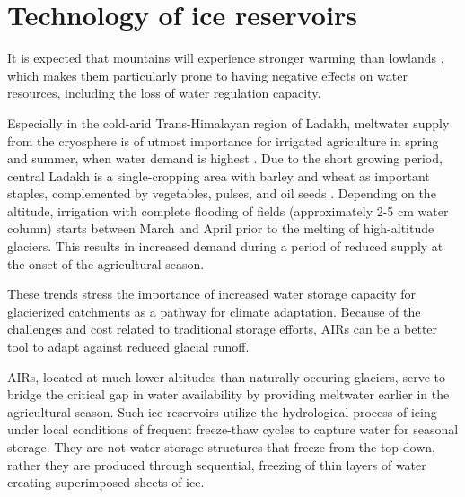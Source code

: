 \chapter{Technology of ice reservoirs}
\label{chap:tech}


It is expected that mountains will experience stronger warming than lowlands
\citep{ragettliContrastingClimateChange2016}, which makes them particularly prone to having negative effects on
water resources, including the loss of water regulation capacity. 

Especially in the cold-arid Trans-Himalayan region of Ladakh, meltwater supply from the cryosphere is of utmost
importance for irrigated agriculture in spring and summer, when water demand is highest
\citep{nusserCryosphereFedIrrigationNetworks2019}. Due to the short growing period, central Ladakh is a
single-cropping area with barley and wheat as important staples, complemented by vegetables, pulses, and oil
seeds \citep{nusserSociohydrologyArtificialGlaciers2019}. Depending on the altitude, irrigation with complete
flooding of fields (approximately 2-5 cm water column) starts between March and April prior to the melting of
high-altitude glaciers. This results in increased demand during a period of reduced supply at the onset of the
agricultural season.

These trends stress the importance of increased water storage capacity for glacierized catchments as a pathway
for climate adaptation. Because of the challenges and cost related to traditional storage efforts, AIRs can be
a better tool to adapt against reduced glacial runoff. 

AIRs, located at much lower altitudes than naturally occuring glaciers, serve to bridge the critical gap in
water availability by providing meltwater earlier in the agricultural season. Such ice reservoirs utilize the
hydrological process of icing under local conditions of frequent freeze-thaw cycles to capture water for
seasonal storage. They are not water storage structures that freeze from the top down, rather they are produced
through sequential, freezing of thin layers of water creating superimposed sheets of ice.



